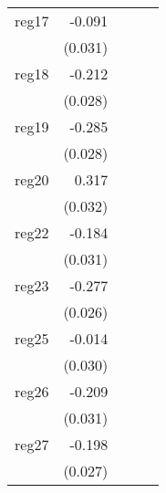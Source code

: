 {\begin{longtable}{l*{4}{D{.}{.}{-1}}}
\addlinespace
reg17       &      -0.091\sym{**} &                     &                     &                     \\
            &     (0.031)         &                     &                     &                     \\
\addlinespace
reg18       &      -0.212\sym{***}&                     &                     &                     \\
            &     (0.028)         &                     &                     &                     \\
\addlinespace
reg19       &      -0.285\sym{***}&                     &                     &                     \\
            &     (0.028)         &                     &                     &                     \\
\addlinespace
reg20       &       0.317\sym{***}&                     &                     &                     \\
            &     (0.032)         &                     &                     &                     \\
\addlinespace
reg22       &      -0.184\sym{***}&                     &                     &                     \\
            &     (0.031)         &                     &                     &                     \\
\addlinespace
reg23       &      -0.277\sym{***}&                     &                     &                     \\
            &     (0.026)         &                     &                     &                     \\
\addlinespace
reg25       &      -0.014         &                     &                     &                     \\
            &     (0.030)         &                     &                     &                     \\
\addlinespace
reg26       &      -0.209\sym{***}&                     &                     &                     \\
            &     (0.031)         &                     &                     &                     \\
\addlinespace
reg27       &      -0.198\sym{***}&                     &                     &                     \\
            &     (0.027)         &                     &                     &                     \\

\end{longtable}}
